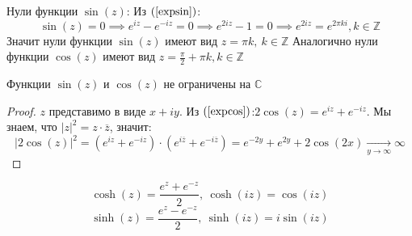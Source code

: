 Нули функции $\sin(z)$:
Из $(\ref{expsin})$:
\[\sin(z) = 0 \implies e^{iz} - e^{-iz} = 0 \implies e^{2iz} - 1 = 0 \implies e^{2iz} = e^{2\pi ki}, k \in \mathbb{Z}\]
Значит нули функции $\sin(z)$ имеют вид $z = \pi k, \ k \in \mathbb{Z}$ Аналогично нули функции $\cos(z)$ имеют вид $z = \frac{\pi}{2} + \pi k, k \in \mathbb{Z}$

\begin{note}
    Функции $\sin(z)$ и $\cos(z)$ не ограничены на $\mathbb{C}$
    \begin{proof}
        $z$ представимо в виде $x + iy$. Из $(\ref{expcos})$:$2\cos(z) = e^{iz} + e^{-iz}$. Мы знаем, что $\left| z \right|^2 = z \cdot \overline{z}$, значит:
        \[\left| 2 \cos(z)\right|^2 = (e^{iz} + e^{-iz})\cdot(e^{i\overline{z}} + e^{-i\overline{z}}) = e^{-2y}+e^{2y} + 2\cos(2x) \underset{y \to \infty}{\to} \infty\]
    \end{proof}
\end{note}

\begin{definition}
    \[\cosh(z) = \frac{e^z + e^{-z}}{2}, \ \cosh(iz) = \cos(iz)\]
    \[\sinh(z) = \frac{e^z - e^{-z}}{2}, \ \sinh(iz) = i\sin(iz)\] 
\end{definition}
